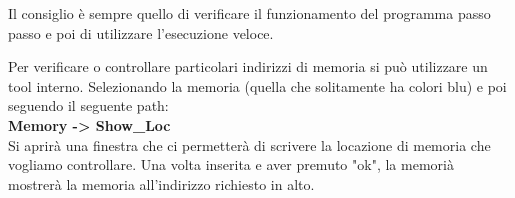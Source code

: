 Il consiglio è sempre quello di verificare il funzionamento del programma passo passo e poi di utilizzare l'esecuzione veloce.

Per verificare o controllare particolari indirizzi di memoria si può utilizzare un tool interno.
Selezionando la memoria (quella che solitamente ha colori blu) e poi seguendo il seguente path:
\\
\textbf{Memory -> Show\_Loc}
\\
Si aprirà una finestra che ci permetterà di scrivere la locazione di memoria che vogliamo controllare. Una volta inserita e aver premuto "ok", la memorià mostrerà la memoria all'indirizzo richiesto in alto.
